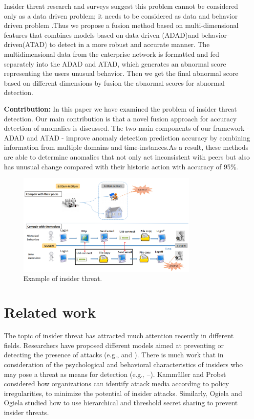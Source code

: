 \documentclass[conference]{IEEEtran}
\begin{document}
Insider threat research and surveys suggest this problem cannot be considered only as a data driven problem; it needs to be considered as data and behavior driven problem \cite{b9}.Thus we propose a fusion method based on multi-dimensional features that combines models based on data-driven (ADAD)and behavior-driven(ATAD) to detect in a more robust and accurate manner.
The multidimensional data from the enterprise network is formatted and fed separately into the ADAD and ATAD, which generates an abnormal score representing the users unusual behavior. Then we get the final abnormal score based on different dimensions by fusion the abnormal scores  for abnormal detection.

\textbf{Contribution:}
In this paper we have examined the problem of insider threat detection. Our main contribution is that a novel fusion approach for accuracy detection of anomalies is discussed. The two main components of our framework - ADAD and ATAD - improve anomaly detection prediction accuracy by combining information from multiple domains and time-instances.As a result, these methods are able to determine anomalies that not only act inconsistent with peers but also has unusual change compared with their historic action with accuracy of 95\%. 

\begin{figure}[htb]
\centerline{\includegraphics[width = 0.8\textwidth]{figure/figure1.png}}
\caption{Example of insider threat.}
\label{fig}
\end{figure}


\section{Related work}

\iffalse
The topic of insider threat has attracted much attention recently in different fields. Researchers have proposed different models aimed at preventing or detecting the presence of attacks (e.g., \cite{b16}and \cite{b17}). There is much work that in consideration of the psychological and behavioral characteristics of insiders who may pose a threat as means for detection (e.g., \cite{b18}–\cite{b19}). Kammüller and Probst \cite{b20} considered how organizations can identify attack media according to policy irregularities, to minimize the potential of insider attacks. Similarly, Ogiela and Ogiela \cite{b21} studied how to use hierarchical and threshold secret sharing to prevent insider threats. 
\end{document}
